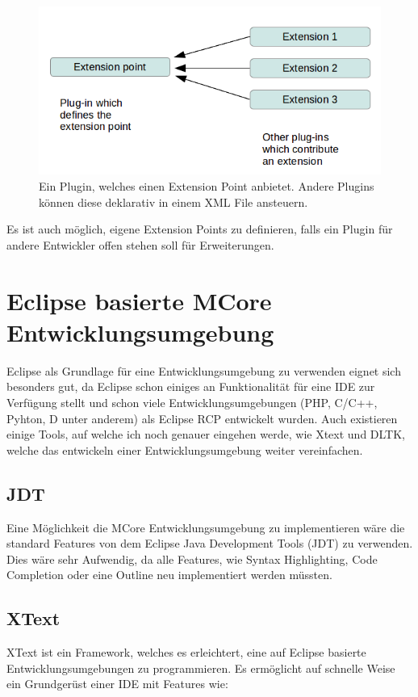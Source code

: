\begin{figure}[H]
	\centering
		\includegraphics[scale=0.5]{platform/extensionpoint.png}
		\caption{Ein Plugin, welches einen Extension Point anbietet. Andere Plugins können diese deklarativ in einem XML File ansteuern.}
		\label{fig:extensionpoint}
\end{figure}

Es ist auch möglich, eigene Extension Points zu definieren, falls ein Plugin für andere Entwickler offen stehen soll für Erweiterungen.

\section{Eclipse basierte MCore Entwicklungsumgebung}

Eclipse als Grundlage für eine Entwicklungsumgebung zu verwenden eignet sich besonders gut, da Eclipse schon einiges an Funktionalität für eine IDE zur Verfügung stellt und schon viele Entwicklungsumgebungen (PHP, C/C++, Pyhton, D unter anderem) als Eclipse RCP entwickelt wurden. Auch existieren einige Tools, auf welche ich noch genauer eingehen werde, wie Xtext und DLTK, welche das entwickeln einer Entwicklungsumgebung weiter vereinfachen.

\subsection{JDT}
Eine Möglichkeit die MCore Entwicklungsumgebung zu implementieren wäre die standard Features von dem Eclipse Java Development Tools (JDT) zu verwenden. Dies wäre sehr Aufwendig, da alle Features, wie Syntax Highlighting, Code Completion oder eine Outline neu implementiert werden müssten.

\subsection{XText}
XText ist ein Framework, welches es erleichtert, eine auf Eclipse basierte Entwicklungsumgebungen zu programmieren. Es ermöglicht auf schnelle Weise ein Grundgerüst einer IDE mit Features wie:

